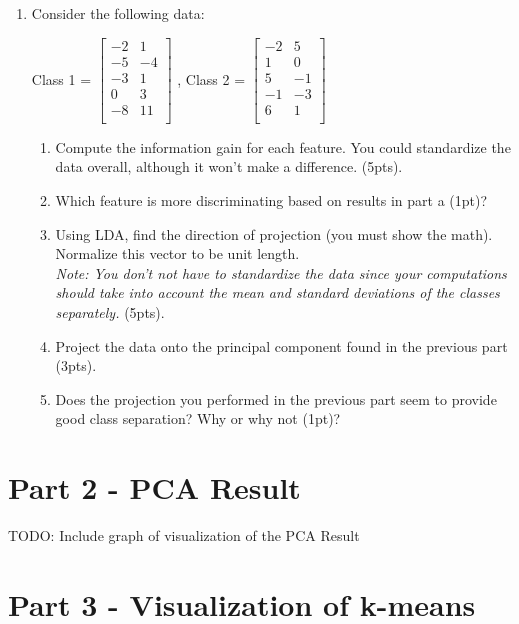 \documentclass[12pt]{article}
\begin{document}
\begin{enumerate}
\newpage
\item Consider the following data:\\
\begin{center}
Class 1 = 
$
 \begin{bmatrix}
	-2 & 1\\
	-5 & -4\\	
	-3 & 1\\
	0 & 3\\
	-8 & 11\\
	
\end{bmatrix}
$
, Class 2 = 
$
 \begin{bmatrix}
	-2 & 5\\
	1 & 0\\
	5 & -1\\
	-1 & -3\\
	6 & 1\\
\end{bmatrix}
$
\end{center}
	\begin{enumerate}
	\item Compute the information gain for each feature.  You could standardize the data overall, although it won't make a difference. (5pts).
\newpage
	\item Which feature is more discriminating based on results in part a (1pt)?
\newpage
	\item Using LDA, find the direction of projection (you must show the math).  Normalize this vector to be unit length.\\ \emph{Note: You don't not have to standardize the data since your computations should take into account the mean and standard deviations of the classes separately.}  (5pts).
\newpage
	\item Project the data onto the principal component found in the previous part (3pts).
\newpage
	\item Does the projection you performed in the previous part seem to provide good class separation?  Why or why not (1pt)?
	\end{enumerate}
\end{enumerate}

\newpage
\section*{Part 2 - PCA Result}
TODO: Include graph of visualization of the PCA Result
\section*{Part 3 - Visualization of k-means}
\end{document}
